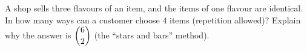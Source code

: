 A shop sells three flavours of an item, and the items of one flavour are identical. In how many ways can a customer choose $4$ items (repetition allowed)? Explain why the answer is $\dbinom{6}{2}$ (the ``stars and bars'' method).
